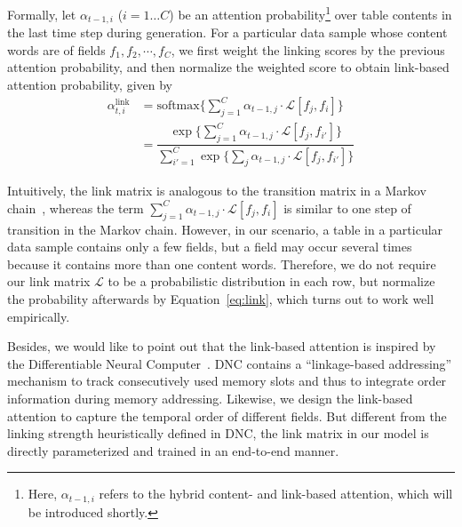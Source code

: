 \documentclass[letterpaper]{article} %
\begin{document}
Formally, let $\alpha_{t-1,i}$ ($i=1\dots C$) be an attention probability\footnote{Here, $\alpha_{t-1,i}$ refers to the hybrid content- and link-based attention, which will be introduced shortly.}  over table contents in the last time step during generation. For a particular data sample whose content words are of fields $f_1, f_2, \cdots, f_C$, we first weight the linking scores by the previous attention probability, and then normalize the weighted score to obtain link-based attention probability, given by
\begin{align}
\alpha_{t,i}^\text{link}&=\text{softmax}\bigg\{\sum_{j=1}^C\alpha_{t-1,j}\cdot\mathscr{L}[f_{\!j},f_{\!i}]\bigg\}\\
&=\dfrac{\exp\big\{
		\sum_{j=1}^C\alpha_{t-1,j}\cdot\mathscr{L}[f_{\!j},f_{\!i'}]
	\big\}
	}{\sum_{i'=1}^C\exp\big\{\sum_{j}\alpha_{t-1,j}\cdot\mathscr{L}[f_{\!j},f_{\!i'}]\big\}}\label{eq:link}
\end{align}

Intuitively, the link matrix is analogous to the transition matrix in a Markov chain~\cite{stochasticprocess}, whereas the term $\sum_{j=1}^C\alpha_{t-1,j}\cdot\mathscr{L}[f_{\!j},f_{\!i}]$ is similar to one step of transition in the Markov chain. However, in our scenario, a table in a particular data sample contains only a few fields, but a field may occur several times because it contains more than one content words. Therefore, we do not require our link matrix $\mathscr{L}$ to be a probabilistic distribution in each row, but normalize the probability afterwards by Equation~\ref{eq:link}, which turns out to work well empirically.

Besides, we would like to point out that the link-based attention is inspired by the Differentiable Neural Computer~\cite[DNC]{DNC}. DNC contains a ``linkage-based addressing'' mechanism to track consecutively used memory slots and thus to integrate order information during memory addressing. Likewise, we design the link-based attention to capture the temporal order of different fields. But different from the linking strength heuristically defined in DNC, the link matrix in our model is directly parameterized and trained in an end-to-end manner.
\end{document}
